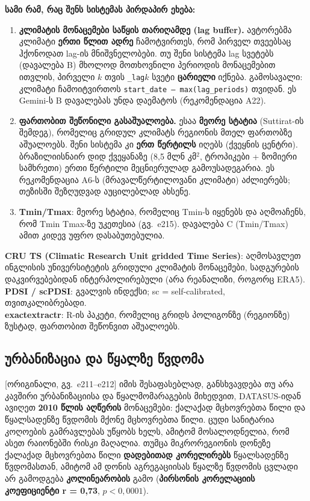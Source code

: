\documentclass[11pt,a4paper]{article}
\newcommand{\imp}[1]{\textbf{\color{importred}#1}}
\newcommand{\pg}[1]{{\small\color{gray}[ორიგინალი, გვ.~#1]}}
\begin{document}
\begin{alarm}
\textbf{სამი რამ, რაც შენს სისტემას პირდაპირ ეხება:}
\begin{enumerate}[leftmargin=1.5em]
  \item \imp{კლიმატის მონაცემები საწყის თარიღამდე (lag buffer).} ავტორებმა კლიმატი \textbf{ერთი წლით ადრე} ჩამოტვირთეს, რომ
    პირველ თვეებსაც ჰქონოდათ lag-ის მნიშვნელობები. თუ შენი სისტემა lag სვეტებს (დავალება B) მხოლოდ მოთხოვნილი პერიოდის
    მონაცემებით ითვლის, პირველი $k$ თვის \texttt{\_lag$k$} სვეტი \textbf{ცარიელი} იქნება. გამოსავალი: კლიმატი ჩამოიტვირთოს
    \texttt{start\_date -- max(lag\_periods)} თვიდან. ეს Gemini-ს B დავალებას უნდა დაემატოს (რეკომენდაცია A22).
  \item \textbf{ფართობით შეწონილი გასაშუალოება.} ესაა \textbf{მეორე სტატია} (Suttirat-ის შემდეგ), რომელიც გრიდულ კლიმატს
    რეგიონის მთელ ფართობზე აშუალოებს. შენი სისტემა კი \textbf{ერთ წერტილს} იღებს (ქვეყნის ცენტრი). ბრაზილიისნაირ
    დიდ ქვეყანაზე (8,5 მლნ კმ$^2$, ტროპიკები + ზომიერი სამხრეთი) ერთი წერტილი მეცნიერულად გამოუსადეგარია. ეს რეკომენდაცია A6-ს
    (მრავალწერტილოვანი კლიმატი) აძლიერებს; თეზისში შეზღუდვად აუცილებლად ახსენე.
  \item \textbf{Tmin/Tmax}: მეორე სტატია, რომელიც Tmin-ს იყენებს და აღმოაჩენს, რომ Tmin Tmax-ზე უკეთესია (გვ.~e215).
    დავალება C (Tmin/Tmax) ამით კიდევ უფრო დასაბუთებულია.
\end{enumerate}
\end{alarm}

\begin{termin}
\textbf{CRU TS (Climatic Research Unit gridded Time Series)}: აღმოსავლეთ ინგლისის უნივერსიტეტის გრიდული კლიმატის მონაცემები,
სადგურების დაკვირვებებიდან ინტერპოლირებული (არა რეანალიზი, როგორც ERA5).\\
\textbf{PDSI / scPDSI}: გვალვის ინდექსი; sc = self-calibrated, თვითკალიბრებადი.\\
\textbf{exactextractr}: R-ის პაკეტი, რომელიც გრიდს პოლიგონზე (რეგიონზე) ზუსტად, ფართობით შეწონვით აშუალოებს.
\end{termin}

\subsection*{ურბანიზაცია და წყალზე წვდომა} \pg{e211--e212}
იმის შესაფასებლად, განსხვავდება თუ არა კავშირი ურბანიზაციისა და წყალმომარაგების მიხედვით, DATASUS-იდან ავიღეთ
\textbf{2010 წლის აღწერის} მონაცემები: ქალაქად მცხოვრებთა წილი და წყალსადენზე წვდომის მქონე მცხოვრებთა წილი. ცუდი სანიტარია
კოღოების გამრავლებას უწყობს ხელს, ამიტომ მოსალოდნელია, რომ ასეთ რაიონებში რისკი მაღალია. თუმცა მიკრორეგიონის დონეზე
ქალაქად მცხოვრებთა წილი \textbf{დადებითად კორელირებს} წყალსადენზე წვდომასთან, ამიტომ ამ დონის აგრეგაციისას წყალზე წვდომის
ცვლადი არ გამოდგება \textbf{კოლინეარობის} გამო (\textbf{პირსონის კორელაციის კოეფიციენტი r = 0,73}, $p < 0{,}0001$).
\end{document}
